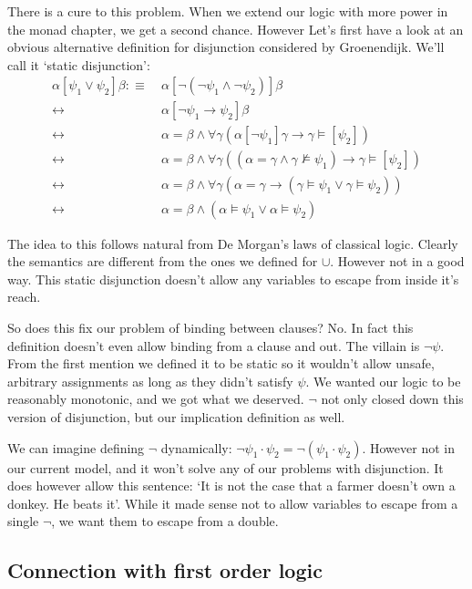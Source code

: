 \documentclass[12pt]{article}
\begin{document}
There is a cure to this problem. When we extend our logic with more power in the monad chapter, we get a second chance. However Let's first have a look at an obvious alternative definition for disjunction considered by Groenendijk\cite{groenendijk1991dynamic}. We'll call it `static disjunction':
\begin{align}
\alpha[\psi_1\vee\psi_2]\beta
 :\equiv&\ \alpha[\neg(\neg\psi_1\wedge\neg\psi_2)]\beta \nonumber\\
 \leftrightarrow&\ \alpha[\neg\psi_1\rightarrow\psi_2]\beta \nonumber\\
 \leftrightarrow&\ \alpha = \beta \wedge \forall\gamma(\alpha[\neg\psi_1]\gamma\rightarrow\gamma\models[\psi_2]) \nonumber\\
 \leftrightarrow&\ \alpha = \beta \wedge \forall\gamma((\alpha=\gamma\wedge\gamma\not\models\psi_1)\rightarrow\gamma\models[\psi_2]) \nonumber\\
 \leftrightarrow&\ \alpha = \beta \wedge \forall\gamma(\alpha=\gamma\rightarrow(\gamma\models\psi_1\vee\gamma\models\psi_2)) \nonumber\\
 \leftrightarrow&\ \alpha = \beta \wedge (\alpha\models\psi_1\vee\alpha\models\psi_2) \label{sem_or}
\end{align}

The idea to this follows natural from De Morgan's laws of classical logic. Clearly the semantics are different from the ones we defined for $\cup$. However not in a good way. This static disjunction doesn't allow any variables to escape from inside it's reach.

So does this fix our problem of binding between clauses? No. In fact this definition doesn't even allow binding from a clause and out. The villain is $\neg\psi$. From the first mention we defined it to be static so it wouldn't allow unsafe, arbitrary assignments as long as they didn't satisfy $\psi$. We wanted our logic to be reasonably monotonic, and we got what we deserved. $\neg$ not only closed down this version of disjunction, but our implication definition as well.

We can imagine defining $\neg$ dynamically: $\neg\psi_1\cdot\psi_2 = \neg(\psi_1\cdot\psi_2)$. However not in our current model, and it won't solve any of our problems with disjunction. It does however allow this sentence: `It is not the case that a farmer doesn't own a donkey. He beats it'. While it made sense not to allow variables to escape from a single $\neg$, we want them to escape from a double.

\subsection{Connection with first order logic}
\end{document}

